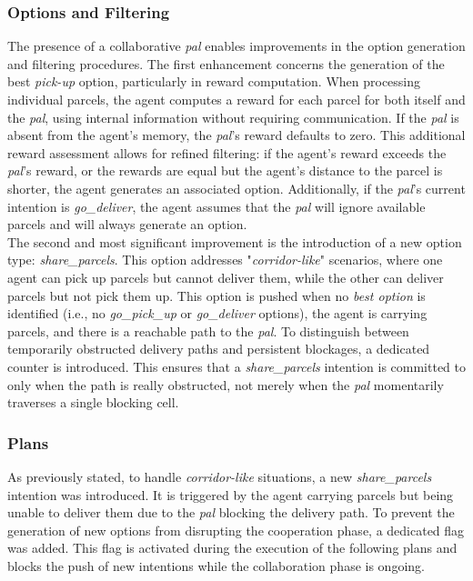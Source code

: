             \subsubsection{Options and Filtering}
                The presence of a collaborative \textit{pal} enables improvements in the option generation and filtering procedures. The first enhancement concerns the generation of the best \textit{pick-up} option, particularly in reward computation. When processing individual parcels, the agent computes a reward for each parcel for both itself and the \textit{pal}, using internal information without requiring communication. If the \textit{pal} is absent from the agent's memory, the \textit{pal}'s reward defaults to zero. This additional reward assessment allows for refined filtering: if the agent's reward exceeds the \textit{pal}'s reward, or the rewards are equal but the agent's distance to the parcel is shorter, the agent generates an associated option. Additionally, if the \textit{pal}'s current intention is \textit{go\_deliver}, the agent assumes that the \textit{pal} will ignore available parcels and will always generate an option.
                \medskip\\
                The second and most significant improvement is the introduction of a new option type: \textit{share\_parcels}. This option addresses "\textit{corridor-like}" scenarios, where one agent can pick up parcels but cannot deliver them, while the other can deliver parcels but not pick them up. This option is pushed when no \textit{best option} is identified (i.e., no \textit{go\_pick\_up} or \textit{go\_deliver} options), the agent is carrying parcels, and there is a reachable path to the \textit{pal}. To distinguish between temporarily obstructed delivery paths and persistent blockages, a dedicated counter is introduced. This ensures that a \textit{share\_parcels} intention is committed to only when the path is really obstructed, not merely when the \textit{pal} momentarily traverses a single blocking cell.
            
            \subsubsection{Plans}\label{shareRequest}
                As previously stated, to handle \textit{corridor-like} situations, a new \textit{share\_parcels} intention was introduced. It is triggered by the agent carrying parcels but being unable to deliver them due to the \textit{pal} blocking the delivery path. To prevent the generation of new options from disrupting the cooperation phase, a dedicated flag was added. This flag is activated during the execution of the following plans and blocks the push of new intentions while the collaboration phase is ongoing.

